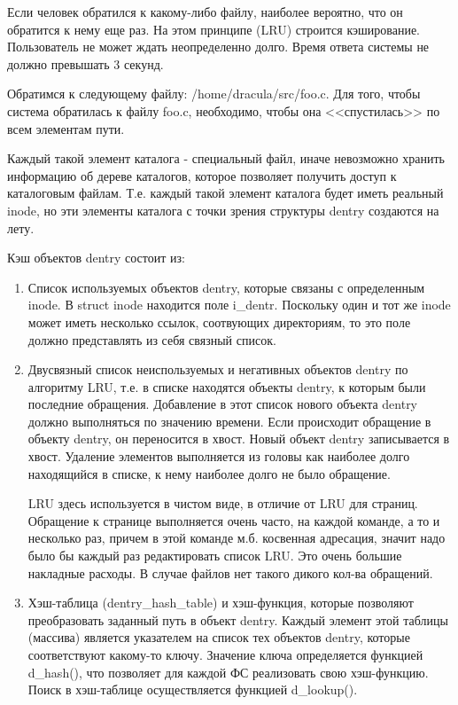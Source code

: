 \documentclass[12pt,a4paper]{scrreprt}
\begin{document}
Если человек обратился к какому-либо файлу, наиболее вероятно, что он обратится к нему еще раз. На этом принципе (LRU) строится кэширование. Пользователь не может ждать неопределенно долго. Время ответа системы не должно превышать 3 секунд.

Обратимся к следующему файлу: /home/dracula/src/foo.c. Для того, чтобы система обратилась к файлу foo.c, необходимо, чтобы она <<спустилась>> по всем элементам пути.

Каждый такой элемент каталога - специальный файл, иначе невозможно хранить информацию об дереве каталогов, которое позволяет получить доступ к каталоговым файлам. Т.е. каждый такой элемент каталога будет иметь реальный inode, но эти элементы каталога с точки зрения структуры dentry создаются на лету.

Кэш объектов dentry состоит из:

\begin{enumerate}
	\item Список используемых объектов dentry, которые связаны с определенным inode. В struct inode находится поле i\_dentr. Поскольку один и тот же inode может иметь несколько ссылок, соотвующих директориям, то это поле должно представлять из себя связный список.
	\item Двусвязный список неиспользуемых и негативных объектов dentry по алгоритму LRU, т.е. в списке находятся объекты dentry, к которым были последние обращения. Добавление в этот список нового объекта dentry должно выполняться по значению времени. Если происходит обращение в объекту dentry, он переносится в хвост. Новый объект dentry записывается в хвост. Удаление элементов выполняется из головы как наиболее долго находящийся в списке, к нему наиболее долго не было обращение. 
	
	LRU здесь используется в чистом виде, в отличие от LRU для страниц. Обращение к странице выполняется очень часто, на каждой команде, а то и несколько раз, причем в этой команде м.б. косвенная адресация, значит надо было бы каждый раз редактировать список LRU. Это очень большие накладные расходы. В случае файлов нет такого дикого кол-ва обращений.
	\item Хэш-таблица (dentry\_hash\_table) и хэш-функция, которые позволяют преобразовать заданный путь в объект dentry. Каждый элемент этой таблицы (массива) является указателем на список тех объектов dentry, которые соответствуют какому-то ключу. Значение ключа определяется функцией d\_hash(), что позволяет для каждой ФС реализовать свою хэш-функцию. Поиск в хэш-таблице осуществляется функцией d\_lookup().
\end{enumerate}
\end{document}
